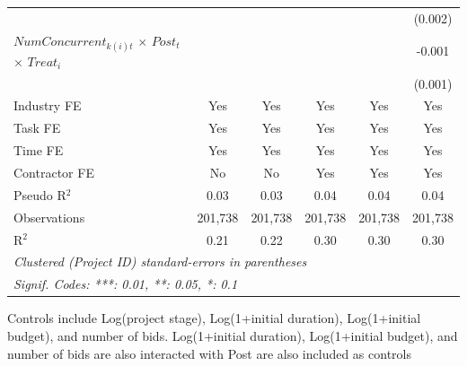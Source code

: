 \documentclass[
]{article}
\begin{document}
\begin{table}[htbp]
\begin{tabular}{lccccc}
                                                                     &                &                &                &                & (0.002)\\   
      $NumConcurrent_{k(i)t}$ $\times$ $Post_t$ $\times$ $Treat_i$   &                &                &                &                & -0.001\\   
                                                                     &                &                &                &                & (0.001)\\   
      \midrule 
      Industry FE                                                    & Yes            & Yes            & Yes            & Yes            & Yes\\  
      Task FE                                                        & Yes            & Yes            & Yes            & Yes            & Yes\\  
      Time FE                                                        & Yes            & Yes            & Yes            & Yes            & Yes\\  
      Contractor FE                                                  & No             & No             & Yes            & Yes            & Yes\\  
      Pseudo R$^2$                                                   & 0.03           & 0.03           & 0.04           & 0.04           & 0.04\\  
      Observations                                                   & 201,738        & 201,738        & 201,738        & 201,738        & 201,738\\  
      R$^2$                                                          & 0.21           & 0.22           & 0.30           & 0.30           & 0.30\\  
      \midrule
      \multicolumn{6}{l}{\emph{Clustered (Project ID) standard-errors in parentheses}}\\
      \multicolumn{6}{l}{\emph{Signif. Codes: ***: 0.01, **: 0.05, *: 0.1}}\\
   \end{tabular}
   
   \par \raggedright 
   Controls include Log(project stage), Log(1+initial duration), Log(1+initial budget), and number of bids. Log(1+initial duration), Log(1+initial budget), and number of bids are also interacted with Post are also included as controls
\end{table}
\end{document}
